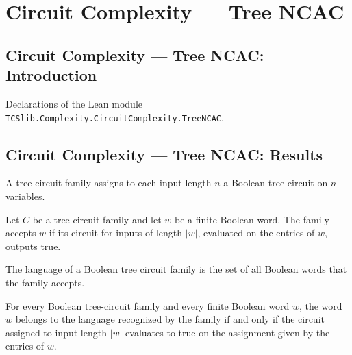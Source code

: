 \section{Circuit Complexity --- Tree NCAC}
\subsection*{Circuit Complexity --- Tree NCAC: Introduction}

Declarations of the Lean module \texttt{TCSlib.Complexity.CircuitComplexity.TreeNCAC}.

\subsection*{Circuit Complexity --- Tree NCAC: Results}

\begin{definition}
\label{BoolCircuit.TreeCircuitFamily}
\leanok
{}
A tree circuit family assigns to each input length $n$ a Boolean tree circuit on $n$
variables.
\end{definition}

\begin{definition}
\label{BoolCircuit.TreeCircuitFamily.Accepts}
\leanok
{}
Let $C$ be a tree circuit family and let $w$ be a finite Boolean word. The family
accepts $w$ if its circuit for inputs of length $|w|$, evaluated on the entries of $w$,
outputs true.
\end{definition}

\begin{definition}
\label{BoolCircuit.TreeCircuitFamily.language}
\leanok
{}
The language of a Boolean tree circuit family is the set of all Boolean words that the
family accepts.
\end{definition}

\begin{theorem}
\label{BoolCircuit.TreeCircuitFamily.mem_language_iff}
\leanok
{}
For every Boolean tree-circuit family and every finite Boolean word $w$, the word $w$
belongs to the language recognized by the family if and only if the circuit assigned to
input length $|w|$ evaluates to true on the assignment given by the entries of $w$.
\end{theorem}

